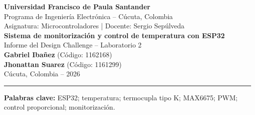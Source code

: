 \documentclass[11pt,letterpaper]{article}
\begin{document}
\begin{center}
  {\small \textbf{Universidad Francisco de Paula Santander}\\
  Programa de Ingeniería Electrónica -- Cúcuta, Colombia\\
  Asignatura: Microcontroladores \quad | \quad Docente: Sergio Sepúlveda}\\[0.9em]
  {\LARGE\bfseries Sistema de monitorización y control de temperatura con ESP32}\\[0.4em]
  {\large Informe del Design Challenge -- Laboratorio 2}\\[0.8em]
  {\normalsize \textbf{Gabriel Ibañez} (Código: 1162168)\\
  \textbf{Jhonattan Suarez} (Código: 1161299)}\\[0.5em]
  {\small Cúcuta, Colombia -- 2026}
\end{center}
\vspace{0.25em}\hrule\vspace{0.5em}

\begin{otherlanguage}{english}
\begin{abstract}
For this laboratory project, we built a small chamber to test temperature monitoring and control with an ESP32. Two incandescent bulbs were used for heating and a four-wire fan for cooling. The temperature was measured with a K-type thermocouple connected to a MAX6675 module. We programmed a manual mode, in which two potentiometers set the outputs, and an automatic mode, in which two linear relationships change the heating or cooling duty cycle according to the measured temperature. The fan received a 25 kHz PWM signal, while the lamps were switched by a solid-state relay in five-second windows. We also used an OLED screen and a Python application to view the readings. One photograph shows 41.8~\textdegree C on the OLED with a 43.0~\textdegree C setpoint, which gives a difference of 1.2~\textdegree C at that instant. The photographs confirm that the monitoring interface was operating, but they do not provide enough information to calculate settling time or steady-state error. We also found that the setpoint shown in the photos differs from the range configured in the supplied firmware. A complete recorded test with the final program is therefore needed to assess the controller's performance.
\end{abstract}
\end{otherlanguage}
\vspace{-0.4em}
\noindent\textbf{Palabras clave:} ESP32; temperatura; termocupla tipo K; MAX6675; PWM; control proporcional; monitorización.\vspace{0.25em}
\end{document}
